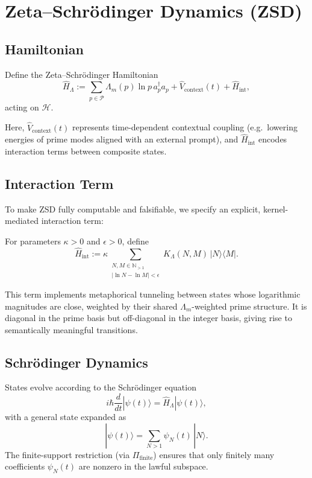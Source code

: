 \documentclass[11pt]{article}
\begin{document}
\section{Zeta--Schr\"odinger Dynamics (ZSD)}

\subsection{Hamiltonian}

\begin{definition}
Define the Zeta--Schr\"odinger Hamiltonian
\[
  \hat{H}_{\Lambda}
    := \sum_{p \in \mathcal{P}}
       \Lambda_m(p) \ln p \, a_p^\dagger a_p
       + \hat{V}_{\text{context}}(t)
       + \hat{H}_{\text{int}},
\]
acting on $\mathcal{H}$.
\end{definition}

Here, $\hat{V}_{\text{context}}(t)$ represents time-dependent
contextual coupling (e.g.\ lowering energies of prime modes aligned
with an external prompt), and $\hat{H}_{\text{int}}$ encodes
interaction terms between composite states.

\subsection{Interaction Term}

To make ZSD fully computable and falsifiable, we specify an explicit,
kernel-mediated interaction term:

\begin{definition}
For parameters $\kappa > 0$ and $\epsilon > 0$, define
\[
  \hat{H}_{\text{int}}
    := \kappa \sum_{\substack{N,M \in \mathbb{N}_{>1} \\
                |\ln N - \ln M| < \epsilon}}
       K_{\Lambda}(N,M) \, |N\rangle \langle M|.
\]
\end{definition}

This term implements metaphorical tunneling between states whose
logarithmic magnitudes are close, weighted by their shared
$\Lambda_m$-weighted prime structure. It is diagonal in the prime
basis but off-diagonal in the integer basis, giving rise to
semantically meaningful transitions.

\subsection{Schr\"odinger Dynamics}

States evolve according to the Schr\"odinger equation
\[
  i \hbar \frac{d}{dt} |\psi(t)\rangle
    = \hat{H}_{\Lambda} |\psi(t)\rangle,
\]
with a general state expanded as
\[
  |\psi(t)\rangle
    = \sum_{N>1} \psi_N(t) \, |N\rangle.
\]
The finite-support restriction (via $\Pi_{\text{finite}}$) ensures
that only finitely many coefficients $\psi_N(t)$ are nonzero in the
lawful subspace.
\end{document}
